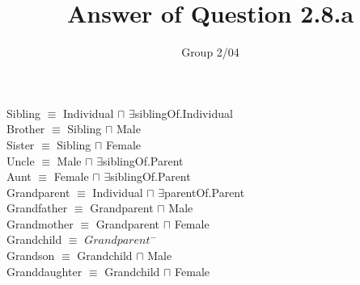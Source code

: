 \documentclass[pape=a4, fontsize=12pt]{article}
\author{Group 2/04}
\title{\textbf{Answer of Question 2.8.a}}
\date{}
\begin{document}
\maketitle
\noindent
Sibling $ \equiv $ Individual $ \sqcap$ $ \exists$siblingOf.Individual \\
Brother $ \equiv $ Sibling $ \sqcap $ Male \\
Sister $ \equiv $ Sibling $ \sqcap $ Female \\
Uncle $ \equiv $ Male $ \sqcap $ $ \exists$siblingOf.Parent \\
Aunt $ \equiv $ Female $ \sqcap $ $ \exists$siblingOf.Parent \\
Grandparent $ \equiv $ Individual $ \sqcap $ $ \exists$parentOf.Parent \\
Grandfather $ \equiv $ Grandparent $ \sqcap $ Male \\
Grandmother $ \equiv $ Grandparent $ \sqcap $ Female \\
Grandchild $ \equiv $ $ Grandparent^{-} $ \\
Grandson $ \equiv $ Grandchild $ \sqcap $ Male \\
Granddaughter $ \equiv $ Grandchild $ \sqcap $ Female \\
\end{document}
